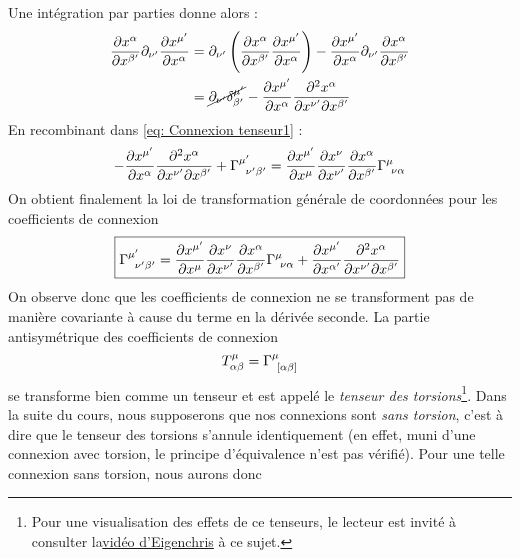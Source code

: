 Une intégration par parties donne alors :
\begin{align}
    \frac{\partial x^{\alpha}}{\partial x^{\beta '}}\partial_{\nu '} \frac{\partial x^{\mu '}}{\partial x^{\alpha}} &= \partial_{\nu '}\left(\frac{\partial x^{\alpha}}{\partial x^{\beta '}}\frac{\partial x^{\mu '}}{\partial x^{\alpha}}\right) - \frac{\partial x^{\mu '}}{\partial x^{\alpha}} \partial_{\nu '}\frac{\partial x^{\alpha}}{\partial x^{\beta '}} \\
    &= \cancel{\partial_{\nu '} \delta^{\mu'}_{\beta'}} - \frac{\partial x^{\mu '}}{\partial x^{\alpha}}\frac{\partial^2 x^{\alpha}}{\partial x^{\nu '}\partial x^{\beta '}} 
\end{align}
En recombinant dans \ref{eq: Connexion tenseur1} :
\begin{equation}
    - \frac{\partial x^{\mu '}}{\partial x^{\alpha}}\frac{\partial^2 x^{\alpha}}{\partial x^{\nu '}\partial x^{\beta '}} +\Gamma\indices{^{\mu '}_{\!\!\nu '\beta '}} = \frac{\partial x^{\mu'}}{\partial x^{\mu}}\frac{\partial x^{\nu}}{\partial x^{\nu '}}\frac{\partial x^{\alpha}}{\partial x^{\beta '}} \Gamma\indices{^{\mu}_{\!\nu \alpha}} 
\end{equation}
 On obtient finalement la loi de transformation générale de coordonnées pour les coefficients de connexion
\begin{equation}
    \boxed{\Gamma\indices{^{\mu '}_{\!\!\nu '\beta '}} = \frac{\partial x^{\mu'}}{\partial x^{\mu}}\frac{\partial x^{\nu}}{\partial x^{\nu '}}\frac{\partial x^{\alpha}}{\partial x^{\beta '}} \Gamma\indices{^{\mu}_{\!\nu \alpha}} +\frac{\partial x^{\mu '}}{\partial x^{\alpha '}}\frac{\partial ^2 x^{\alpha}}{\partial x^{\nu'}\partial x^{\beta '}} }
\end{equation}
On observe donc que les coefficients de connexion ne se transforment pas de manière covariante à cause du terme en la dérivée seconde. La partie antisymétrique des coefficients de connexion
\begin{equation}
    T^\mu_{\alpha\beta} = \Gamma\indices{^\mu_{\![\alpha\beta]}}
\end{equation}
se transforme bien comme un tenseur et est appelé le \emph{tenseur des torsions}\footnote{Pour une visualisation des effets de ce tenseurs, le lecteur est invité à consulter la\href{https://www.youtube.com/watch?v=SfOiOPuS2_U}{vidéo d'Eigenchris} à ce sujet.}. Dans la suite du cours, nous supposerons que nos connexions sont \emph{sans torsion}, c'est à dire que le tenseur des torsions s'annule identiquement (en effet, muni d'une connexion avec torsion, le principe d'équivalence n'est pas vérifié). Pour une telle connexion sans torsion, nous aurons donc
